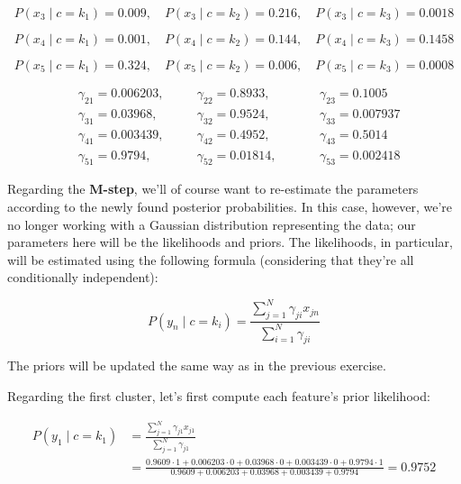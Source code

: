 \documentclass[12pt]{article}
\begin{document}
\begin{enumerate}[leftmargin=\labelsep]
  \begin{equation*}
    P(x_3 \mid c = k_1) = 0.009, \quad P(x_3 \mid c = k_2) = 0.216, \quad P(x_3 \mid c = k_3) = 0.0018
  \end{equation*}

  \begin{equation*}
    P(x_4 \mid c = k_1) = 0.001, \quad P(x_4 \mid c = k_2) = 0.144, \quad P(x_4 \mid c = k_3) = 0.1458
  \end{equation*}

  \begin{equation*}
    P(x_5 \mid c = k_1) = 0.324, \quad P(x_5 \mid c = k_2) = 0.006, \quad P(x_5 \mid c = k_3) = 0.0008
  \end{equation*}

  \begin{equation*}
    \begin{aligned}
       & \gamma_{21} = 0.006203, \quad &  & \gamma_{22} = 0.8933, \quad  &  &  & \gamma_{23} = 0.1005   \\
       & \gamma_{31} = 0.03968, \quad  &  & \gamma_{32} = 0.9524, \quad  &  &  & \gamma_{33} = 0.007937 \\
       & \gamma_{41} = 0.003439, \quad &  & \gamma_{42} = 0.4952, \quad  &  &  & \gamma_{43} = 0.5014   \\
       & \gamma_{51} = 0.9794, \quad   &  & \gamma_{52} = 0.01814, \quad &  &  & \gamma_{53} = 0.002418
    \end{aligned}
  \end{equation*}

  Regarding the \textbf{M-step}, we'll of course want to re-estimate the parameters
  according to the newly found posterior probabilities. In this case, however, we're no
  longer working with a Gaussian distribution representing the data; our parameters here
  will be the likelihoods and priors. The likelihoods, in particular, will be estimated
  using the following formula (considering that they're all conditionally independent):

  \begin{equation*}
    P(y_n \mid c = k_i) = \frac{\sum_{j=1}^N \gamma_{ji} x_{jn}}{\sum_{i=1}^N \gamma_{ji}}
  \end{equation*}

  The priors will be updated the same way as in the previous exercise.

  Regarding the first cluster, let's first compute each feature's prior likelihood:

  \begin{equation*}
    \begin{aligned}
      P(y_1 \mid c = k_1) & = \frac{\sum_{j=1}^N \gamma_{j1} x_{j1}}{\sum_{j=1}^N \gamma_{j1}}                                                                                         \\
                          & = \frac{0.9609 \cdot 1 + 0.006203 \cdot 0 + 0.03968 \cdot 0 + 0.003439 \cdot 0 + 0.9794 \cdot 1}{0.9609 + 0.006203 + 0.03968 + 0.003439 + 0.9794} = 0.9752
    \end{aligned}
  \end{equation*}


\end{enumerate}
\end{document}
